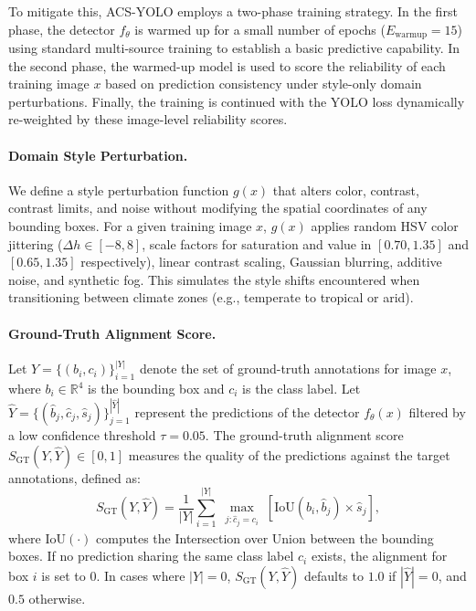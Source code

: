 \documentclass[12pt,a4paper]{article}
\begin{document}
To mitigate this, ACS-YOLO employs a two-phase training strategy. In the first phase, the detector $f_\theta$ is warmed up for a small number of epochs ($E_{\text{warmup}} = 15$) using standard multi-source training to establish a basic predictive capability. In the second phase, the warmed-up model is used to score the reliability of each training image $x$ based on prediction consistency under style-only domain perturbations. Finally, the training is continued with the YOLO loss dynamically re-weighted by these image-level reliability scores.

\paragraph{Domain Style Perturbation.}
We define a style perturbation function $g(x)$ that alters color, contrast, contrast limits, and noise without modifying the spatial coordinates of any bounding boxes. For a given training image $x$, $g(x)$ applies random HSV color jittering ($\Delta h \in [-8, 8]$, scale factors for saturation and value in $[0.70, 1.35]$ and $[0.65, 1.35]$ respectively), linear contrast scaling, Gaussian blurring, additive noise, and synthetic fog. This simulates the style shifts encountered when transitioning between climate zones (e.g., temperate to tropical or arid).

\paragraph{Ground-Truth Alignment Score.}
Let $Y = \{(b_i, c_i)\}_{i=1}^{|Y|}$ denote the set of ground-truth annotations for image $x$, where $b_i \in \mathbb{R}^4$ is the bounding box and $c_i$ is the class label. Let $\hat{Y} = \{(\hat{b}_j, \hat{c}_j, \hat{s}_j)\}_{j=1}^{|\hat{Y}|}$ represent the predictions of the detector $f_\theta(x)$ filtered by a low confidence threshold $\tau = 0.05$. The ground-truth alignment score $S_{\text{GT}}(Y, \hat{Y}) \in [0, 1]$ measures the quality of the predictions against the target annotations, defined as:
\begin{equation}
    S_{\text{GT}}(Y, \hat{Y}) = \frac{1}{|Y|} \sum_{i=1}^{|Y|} \max_{\substack{j: \hat{c}_j = c_i}} \left[ \text{IoU}(b_i, \hat{b}_j) \times \hat{s}_j \right],
\end{equation}
where $\text{IoU}(\cdot)$ computes the Intersection over Union between the bounding boxes. If no prediction sharing the same class label $c_i$ exists, the alignment for box $i$ is set to $0$. In cases where $|Y| = 0$, $S_{\text{GT}}(Y, \hat{Y})$ defaults to $1.0$ if $|\hat{Y}| = 0$, and $0.5$ otherwise.
\end{document}
